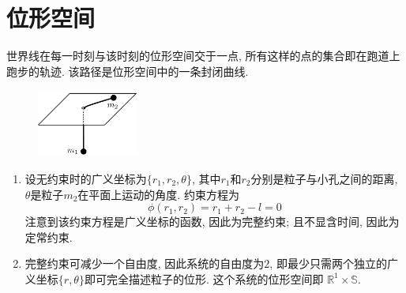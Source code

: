 \chapter{位形空间}
\begin{solution}
    世界线在每一时刻与该时刻的位形空间交于一点, 所有这样的点的集合即在跑道上跑步的轨迹. 该路径是位形空间中的一条封闭曲线.
\end{solution}

\begin{figure}[h]
    \centering
    \includegraphics[width=0.3\textwidth]{content/Figures/2-2}
    \caption{ }
    \label{fig:2-2}
\end{figure}
\begin{solution}
    \begin{enumerate}[label=(\arabic*)]
        \item 设无约束时的广义坐标为$\{r_1, r_2, \theta\}$, 其中$r_1$和$r_2$分别是粒子与小孔之间的距离, $\theta$是粒子$m_2$在平面上运动的角度.
        约束方程为\[
            \phi (r_1, r_2) = r_1 + r_2 - l = 0
        \]
        注意到该约束方程是广义坐标的函数, 因此为完整约束; 且不显含时间, 因此为定常约束.
        \item 完整约束可减少一个自由度, 因此系统的自由度为$2$, 即最少只需两个独立的广义坐标$\{r, \theta\}$即可完全描述粒子的位形. 这个系统的位形空间即 $\mathbb{R}^1 \times \mathbb{S}$.
    \end{enumerate}
\end{solution}


